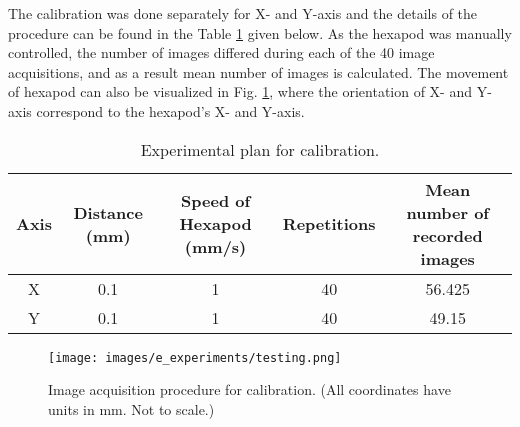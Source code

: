         \noindent The calibration was done separately for X- and Y-axis and the details of the procedure can be found in the Table \ref{table:calibration_plan} given below. As the hexapod was manually controlled, the number of images differed during each of the 40 image acquisitions, and as a result mean number of images is calculated. The movement of hexapod can also be visualized in Fig. \ref{fig:testing.png}, where the orientation of X- and Y-axis correspond to the hexapod's X- and Y-axis.

        \begin{table}[ht]
            \centering
            \footnotesize
            {
            \begin{tabular}{ccccc}
                \toprule
                \textbf{Axis} & \textbf{Distance (mm)} & \textbf{Speed of Hexapod (mm/s)} & \textbf{Repetitions} & \textbf{Mean number of recorded images} \\
                \midrule
                X & 0.1 & 1 & 40 & 56.425 \\
                Y & 0.1 & 1 & 40 & 49.15 \\
                \bottomrule
            \end{tabular}
            }
            \caption{Experimental plan for calibration.}
            \label{table:calibration_plan}
        \end{table}
    
        \begin{figure}[ht]
            \centering
            \texttt{[image: images/e\_experiments/testing.png]}
            \caption{Image acquisition procedure for calibration. (All coordinates have units in mm. Not to scale.)}
            \label{fig:testing.png}
        \end{figure}


